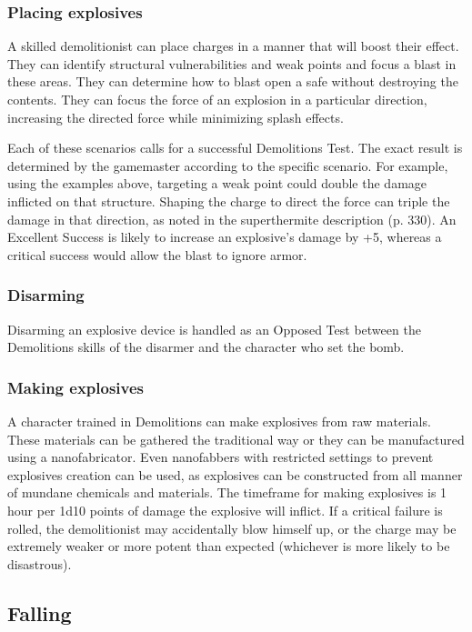 \subsubsection{Placing explosives}

A skilled demolitionist can place charges in a manner that will boost their effect. They can identify structural vulnerabilities and weak points and focus a blast in these areas. They can determine how to blast open a safe without destroying the contents. They can focus the force of an explosion in a particular direction, increasing the directed force while minimizing splash effects.

Each of these scenarios calls for a successful Demolitions Test. The exact result is determined by the gamemaster according to the specific scenario. For example, using the examples above, targeting a weak point could double the damage inflicted on that structure. Shaping the charge to direct the force can triple the damage in that direction, as noted in the superthermite description (p. 330). An Excellent Success is likely to increase an explosive’s damage by +5, whereas a critical success would allow the blast to ignore armor.

\subsubsection{Disarming}

Disarming an explosive device is handled as an Opposed Test between the Demolitions skills of the disarmer and the character who set the bomb.


\subsubsection{Making explosives}

A character trained in Demolitions can make explosives from raw materials. These materials can be gathered the traditional way or they can be manufactured using a nanofabricator. Even nanofabbers with restricted settings to prevent explosives creation can be used, as explosives can be constructed from all manner of mundane chemicals and materials. The timeframe for making explosives is 1 hour per 1d10 points of damage the explosive will inflict. If a critical failure is rolled, the demolitionist may accidentally blow himself up, or the charge may be extremely weaker or more potent than expected (whichever is more likely to be disastrous).


\subsection{Falling}
\label{sec:falling}

